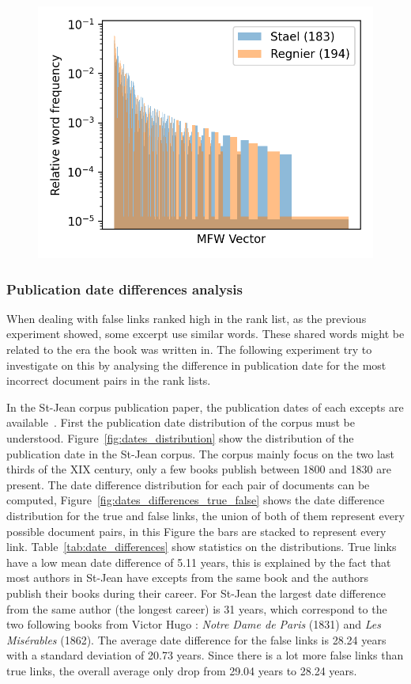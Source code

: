 \begin{figure}
  \label{fig:mfw_vector_last_rl}
  \includegraphics[width=\linewidth]{img/mfw_vector_last_rl.png}
\end{figure}

\subsubsection{Publication date differences analysis}

When dealing with false links ranked high in the rank list, as the previous experiment showed, some excerpt use similar words.
These shared words might be related to the era the book was written in.
The following experiment try to investigate on this by analysing the difference in publication date for the most incorrect document pairs in the rank lists.

In the St-Jean corpus publication paper, the publication dates of each excepts are available~\cite{st_jean}.
First the publication date distribution of the corpus must be understood.
Figure~\ref{fig:dates_distribution} show the distribution of the publication date in the St-Jean corpus.
The corpus mainly focus on the two last thirds of the XIX century, only a few books publish between 1800 and 1830 are present.
The date difference distribution for each pair of documents can be computed, Figure~\ref{fig:dates_differences_true_false} shows the date difference distribution for the true and false links, the union of both of them represent every possible document pairs, in this Figure the bars are stacked to represent every link.
Table~\ref{tab:date_differences} show statistics on the distributions.
True links have a low mean date difference of 5.11 years, this is explained by the fact that most authors in St-Jean have excepts from the same book and the authors publish their books during their career.
For St-Jean the largest date difference from the same author (the longest career) is 31 years, which correspond to the two following books  from Victor Hugo : \textit{Notre Dame de Paris} (1831) and \textit{Les Misérables} (1862).
The average date difference for the false links is 28.24 years with a standard deviation of 20.73 years.
Since there is a lot more false links than true links, the overall average only drop from 29.04 years to 28.24 years.

